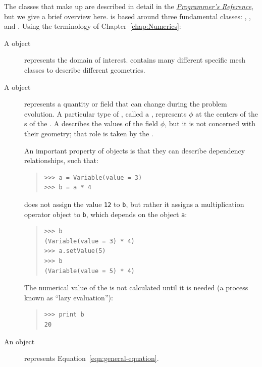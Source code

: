 The \Python{} classes that make up \FiPy{} are described in detail in
the \href{file:reference.pdf}{\textit{\FiPy{} Programmer's
Reference}}, but we give a brief overview here.  \FiPy{} is based
around three fundamental \Python{} classes: ,
, and .  Using the terminology of
Chapter~\ref{chap:Numerics}:
\begin{description}
    \item[A  object] represents the domain of interest.
    \FiPy{} contains many different specific mesh classes to describe
    different geometries.

    \item[A  object] represents a quantity or field
    that can change during the problem evolution.  A particular type
    of , called a , represents \(
    \phi \) at the centers of the s of the .
    A  describes the values of the field \( \phi
    \), but it is not concerned with their geometry; that role is
    taken by the .

    An important property of  objects is that they can
    describe dependency relationships, such that:    
\begin{quote}
\begin{verbatim}
>>> a = Variable(value = 3)
>>> b = a * 4
\end{verbatim}
\end{quote}
    does not assign the value \verb|12| to \verb|b|, but rather it
    assigns a multiplication operator object to \verb|b|, which
    depends on the  object \verb|a|:
\begin{quote}
\begin{verbatim}
>>> b
(Variable(value = 3) * 4)
>>> a.setValue(5)
>>> b
(Variable(value = 5) * 4)
\end{verbatim}
\end{quote}
    The numerical value of the  is not calculated
    until it is needed (a process known as ``lazy evaluation''):
\begin{quote}
\begin{verbatim}
>>> print b
20
\end{verbatim}
\end{quote}

    \item[An  object] represents
    Equation~\eqref{eqn:general-equation}.
    
\end{description}

